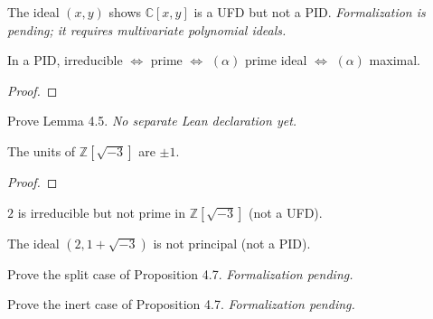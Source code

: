 \begin{theorem}[Exercise 4.3]
  \label{exr:s4_3}
  \notready
  The ideal $(x,y)$ shows $\mathbb C[x,y]$ is a UFD but not a PID. \emph{Formalization is
  pending; it requires multivariate polynomial ideals.}
\end{theorem}

\begin{theorem}[Exercise 4.4]
  \label{exr:s4_4}
  \leanok
  In a PID, irreducible $\iff$ prime $\iff$ $(\alpha)$ prime ideal $\iff$
  $(\alpha)$ maximal.
\end{theorem}
\begin{proof}\leanok\end{proof}

\begin{theorem}[Exercise 4.5]
  \label{exr:s4_5}
  \notready
  Prove Lemma 4.5. \emph{No separate Lean declaration yet.}
\end{theorem}

\begin{theorem}[Exercise 4.6(a)]
  \label{exr:s4_6_a}
  \leanok
  The units of $\mathbb Z[\sqrt{-3}]$ are $\pm1$.
\end{theorem}
\begin{proof}\leanok\end{proof}

\begin{theorem}[Exercise 4.6(b)]
  \label{exr:s4_6_b}
  \leanok
  $2$ is irreducible but not prime in $\mathbb Z[\sqrt{-3}]$ (not a UFD).
\end{theorem}

\begin{theorem}[Exercise 4.6(c)]
  \label{exr:s4_6_c}
  \leanok
  The ideal $(2, 1+\sqrt{-3})$ is not principal (not a PID).
\end{theorem}

\begin{theorem}[Exercise 4.7(a)]
  \label{exr:s4_7_a}
  \notready
  Prove the split case of Proposition 4.7. \emph{Formalization pending.}
\end{theorem}

\begin{theorem}[Exercise 4.7(b)]
  \label{exr:s4_7_b}
  \notready
  Prove the inert case of Proposition 4.7. \emph{Formalization pending.}
\end{theorem}

